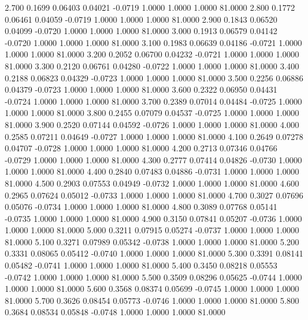    2.700   0.1699   0.06403   0.04021  -0.0719   1.0000   1.0000   1.0000  81.0000
   2.800   0.1772   0.06461   0.04059  -0.0719   1.0000   1.0000   1.0000  81.0000
   2.900   0.1843   0.06520   0.04099  -0.0720   1.0000   1.0000   1.0000  81.0000
   3.000   0.1913   0.06579   0.04142  -0.0720   1.0000   1.0000   1.0000  81.0000
   3.100   0.1983   0.06639   0.04186  -0.0721   1.0000   1.0000   1.0000  81.0000
   3.200   0.2052   0.06700   0.04232  -0.0721   1.0000   1.0000   1.0000  81.0000
   3.300   0.2120   0.06761   0.04280  -0.0722   1.0000   1.0000   1.0000  81.0000
   3.400   0.2188   0.06823   0.04329  -0.0723   1.0000   1.0000   1.0000  81.0000
   3.500   0.2256   0.06886   0.04379  -0.0723   1.0000   1.0000   1.0000  81.0000
   3.600   0.2322   0.06950   0.04431  -0.0724   1.0000   1.0000   1.0000  81.0000
   3.700   0.2389   0.07014   0.04484  -0.0725   1.0000   1.0000   1.0000  81.0000
   3.800   0.2455   0.07079   0.04537  -0.0725   1.0000   1.0000   1.0000  81.0000
   3.900   0.2520   0.07144   0.04592  -0.0726   1.0000   1.0000   1.0000  81.0000
   4.000   0.2585   0.07211   0.04649  -0.0727   1.0000   1.0000   1.0000  81.0000
   4.100   0.2649   0.07278   0.04707  -0.0728   1.0000   1.0000   1.0000  81.0000
   4.200   0.2713   0.07346   0.04766  -0.0729   1.0000   1.0000   1.0000  81.0000
   4.300   0.2777   0.07414   0.04826  -0.0730   1.0000   1.0000   1.0000  81.0000
   4.400   0.2840   0.07483   0.04886  -0.0731   1.0000   1.0000   1.0000  81.0000
   4.500   0.2903   0.07553   0.04949  -0.0732   1.0000   1.0000   1.0000  81.0000
   4.600   0.2965   0.07624   0.05012  -0.0733   1.0000   1.0000   1.0000  81.0000
   4.700   0.3027   0.07696   0.05076  -0.0734   1.0000   1.0000   1.0000  81.0000
   4.800   0.3089   0.07768   0.05141  -0.0735   1.0000   1.0000   1.0000  81.0000
   4.900   0.3150   0.07841   0.05207  -0.0736   1.0000   1.0000   1.0000  81.0000
   5.000   0.3211   0.07915   0.05274  -0.0737   1.0000   1.0000   1.0000  81.0000
   5.100   0.3271   0.07989   0.05342  -0.0738   1.0000   1.0000   1.0000  81.0000
   5.200   0.3331   0.08065   0.05412  -0.0740   1.0000   1.0000   1.0000  81.0000
   5.300   0.3391   0.08141   0.05482  -0.0741   1.0000   1.0000   1.0000  81.0000
   5.400   0.3450   0.08218   0.05553  -0.0742   1.0000   1.0000   1.0000  81.0000
   5.500   0.3509   0.08296   0.05625  -0.0744   1.0000   1.0000   1.0000  81.0000
   5.600   0.3568   0.08374   0.05699  -0.0745   1.0000   1.0000   1.0000  81.0000
   5.700   0.3626   0.08454   0.05773  -0.0746   1.0000   1.0000   1.0000  81.0000
   5.800   0.3684   0.08534   0.05848  -0.0748   1.0000   1.0000   1.0000  81.0000
